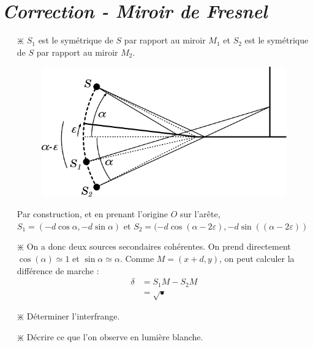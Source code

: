 \documentclass{report}
\begin{document}
\newpage

\section*{\textit{Correction - Miroir de Fresnel}}

\begin{itemize}

	\item[$\divideontimes$] $S_1$ est le symétrique de $S$ par rapport au miroir $M_1$ et $S_2$ est le symétrique de $S$ par rapport au miroir $M_2$. 
	
\begin{figure}[h]
\centering
  \includegraphics[scale=1.0]{fresnel_cor.pdf}
\end{figure}

Par construction, et en prenant l'origine $O$ sur l'arête, $S_1=(-d\cos\alpha,-d\sin\alpha)$ et $S_2=(-d\cos(\alpha-2\varepsilon),-d\sin((\alpha-2\varepsilon))$
	
	\item[$\divideontimes$] On a donc deux sources secondaires cohérentes. On prend directement $\cos(\alpha)\simeq1$ et $\sin\alpha\simeq\alpha$. Comme $M=(x+d,y)$, on peut calculer la différence de marche :
	\begin{align*}
		\delta &= S_1M-S_2M \\
		&=\sqrt{•}
	\end{align*}
	
	\item[$\divideontimes$] Déterminer l'interfrange.
	
	\item[$\divideontimes$] Décrire ce que l'on observe en lumière blanche.

\end{itemize}

\newpage
\end{document}
